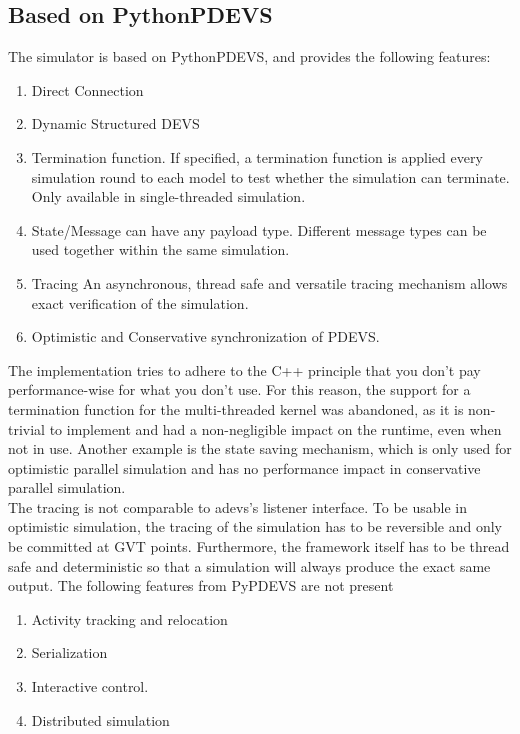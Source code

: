 \subsection{Based on PythonPDEVS}
The simulator is based on PythonPDEVS, and provides the following features: 
\begin{enumerate}
	\item Direct Connection
	\item Dynamic Structured DEVS
	\item Termination function. If specified, a termination function is applied every simulation round to each model to test whether the simulation can terminate. Only available in single-threaded simulation.
	\item State/Message can have any payload type. Different message types can be used together within the same simulation.
	\item Tracing An asynchronous, thread safe and versatile tracing mechanism allows exact verification of the simulation.
	\item Optimistic and Conservative synchronization of PDEVS.
\end{enumerate}
The implementation tries to adhere to the C++ principle that you don't pay performance-wise for what you don't use. For this reason, the support for a termination function for the multi-threaded kernel was abandoned, as it is non-trivial to implement and had a non-negligible impact on the runtime, even when not in use. Another example is the state saving mechanism, which is only used for optimistic parallel simulation and has no performance impact in conservative parallel simulation.\\
The tracing is not comparable to adevs's listener interface. To be usable in optimistic simulation, the tracing of the simulation has to be reversible and only be committed at GVT points. Furthermore, the framework itself has to be thread safe and deterministic so that a simulation will always produce the exact same output.
The following features from PyPDEVS are not present
\begin{enumerate}
	\item Activity tracking and relocation
	\item Serialization
	\item Interactive control. 
	\item Distributed simulation
\end{enumerate}
